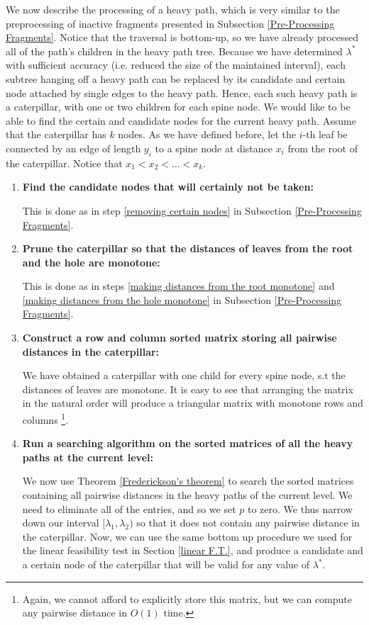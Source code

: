 \documentclass[11pt,a4paper]{article}
\theoremstyle{definition}
\theoremstyle{remark}
\begin{document}
We now describe the processing of a heavy path, which is very similar to the preprocessing of inactive fragments presented in Subsection \ref{Pre-Processing Fragments}. Notice that the traversal is bottom-up, so we have already processed all of the path's children in the heavy path tree. Because we have determined $\lambda^*$ with sufficient accuracy (i.e. reduced the size of the maintained interval), each subtree hanging off a heavy path can be replaced by its candidate and certain node attached by single edges to the heavy path. Hence, each such heavy path is a caterpillar, with one or two children for each spine node. We would like to be able to find the certain and candidate nodes for the current heavy path. %
Assume that the caterpillar has $k$ nodes. As we have defined before, let the $i$-th leaf be connected by an edge of length $y_i$ to a spine node at distance $x_i$ from the root of the caterpillar. Notice that $x_1 < x_2 < ... < x_k$.
\begin{enumerate}
\item\textbf{Find the candidate nodes that will certainly not be taken:}

This is done as in step \ref{removing certain nodes} in Subsection \ref{Pre-Processing Fragments}.
\item\textbf{Prune the caterpillar so that the distances of leaves from the root and the hole are monotone:}	

This is done as in steps \ref{making distances from the root monotone} and \ref{making distances from the hole monotone} in Subsection \ref{Pre-Processing Fragments}.
\item\textbf{Construct a row and column sorted matrix storing all pairwise distances in the caterpillar:}

We have obtained a caterpillar with one child for every spine node, s.t the distances of leaves are monotone. It is easy to see that arranging the matrix in the natural order will produce a triangular matrix with monotone rows and columns \footnote{Again, we cannot afford to explicitly store this matrix, but we can compute any pairwise distance in $O(1)$ time.}.
\item\textbf{Run a searching algorithm on the sorted matrices of all the heavy paths at the current level:}

We now use Theorem \ref{Frederickson's theorem} to search the sorted matrices containing all pairwise distances in the heavy paths of the current level. We need to eliminate all of the entries, and so we set $p$ to zero. We thus narrow down our interval $[\lambda_1,\lambda_2)$ so that it does not contain any pairwise distance in the caterpillar. Now, we can use the same bottom up procedure we used for the linear feasibility test in Section \ref{linear F.T.}, and produce a candidate and a certain node of the caterpillar that will be valid for any value of $\lambda^*$.
\end{enumerate}
\end{document}
